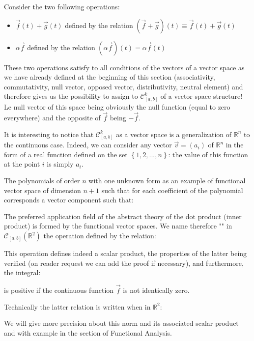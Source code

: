 	 Consider the two following operations:
	\begin{itemize}
		\item $\vec{f}(t)+\vec{g}(t)$ defined by the relation $(\vec{f}+\vec{g})(t)\equiv \vec{f}(t)+\vec{g}(t)$
		\item $\alpha\vec{f}$ defined by the relation $(\alpha \vec{f})(t)=\alpha\vec{f}(t)$
	\end{itemize}
	These two operations satisfy to all conditions of the vectors of a vector space as we have already defined at the beginning of this section (associativity, commutativity, null vector, opposed vector, distributivity, neutral element) and therefore gives us the possibility to assign to $\mathcal{C}_{[a,b]}^k$ of a vector space structure! Le null vector of this space being obviously the null function (equal to zero everywhere) and the opposite of $\vec{f}$ being $-\vec{f}$.

	It is interesting to notice that $\mathcal{C}_{[a,b]}^k$  as a vector space is a generalization of $\mathbb{R}^n$ to the continuous case. Indeed, we can consider any vector $\vec{v}=(a_i)$ of $\mathbb{R}^n$ in the form of a real function defined on the set $\left\lbrace 1,2,...,n \right\rbrace
$: the value of this function at the point $i$ is simply $a_i$.
	
	\begin{tcolorbox}[title=Remark,colframe=black,arc=10pt]
	The polynomials of order $n$ with one unknown form as an example of functional vector space of dimension $n + 1$ such that for each coefficient of the polynomial corresponds a vector component such that:
		
	\end{tcolorbox}
	The preferred application field of the abstract theory of the dot product (inner product) is formed by the functional vector spaces. We name therefore "" in $\mathcal{C}_{[a,b]}(\mathbb{R}^2)$ the operation defined by the relation:
	
	This operation defines indeed a scalar product, the properties of the latter being verified (on reader request we can add the proof if necessary), and furthermore, the integral:
	
	is positive if the continuous function $\vec{f}$ is not identically zero.
	
	Technically the latter relation is written when in $\mathbb{R}^2$:
	
	We will give more precision about this norm and its associated scalar product and with example in the section of Functional Analysis.
	
